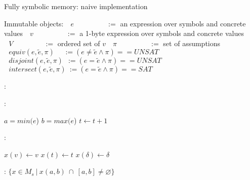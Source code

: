 \documentclass{article}
\let\emptyset\varnothing
\begin{document}
\begin{algorithm}
  \normalsize

  \caption{Fully symbolic memory: naive implementation}
  \begin{algorithmic}
  	\State Immutable objects:
  	\State $~~~e~~~~~~~~~~~~~~~~~~~\,~:=$ an expression over symbols and concrete values
  	\State $~~~v~~~~~~~~~~~~~~~~~~~~\,:=$ a 1-byte expression over symbols and concrete values
  	\State $~~~V~~~~~~~~~~~~~~~~~~~\,:=$ ordered set of $v$
  	\State $~~~\pi~~~~~~~~~~~~~~~~~~~~\,:=$ set of assumptions
  	\State $~~~equiv(e, \widetilde{e}, \pi)~~~~~\,:= (e \not = \widetilde{e} \wedge \pi) == UNSAT$ 
  	\State $~~~disjoint(e, \widetilde{e}, \pi)~~:=  (e = \widetilde{e} \wedge \pi) == UNSAT$ 
  	\State $~~~intersect(e, \widetilde{e}, \pi)~:=  (e = \widetilde{e} \wedge \pi) == SAT$ 

  \end{algorithmic}

  \bigskip
  
  \begin{algorithmic}[1]
	:
			\State {}
		\EndFor
	\EndFunction
  \end{algorithmic}

  \bigskip

  \begin{algorithmic}[1]
	:
		
		\State $a = min(e$)
		\State $b = max(e$)
		\State $t \leftarrow t + 1$
		\State {}

	\EndFunction
  \end{algorithmic}

  \bigskip

  \begin{algorithmic}[1]
	:
		
				\State $x(v) \leftarrow v$
				\State $x(t) \leftarrow t$
				\State $x(\delta) \leftarrow \delta$
				\State \Return
			\EndIf
		\EndFor
		\State {}
	\EndFunction
  \end{algorithmic}

  \bigskip

  \begin{algorithmic}[1]
	:
		\State \Return $\{x \in M_s~|~x(a,b)~\cap~[a, b] \neq \emptyset\}$
	\EndFunction
  \end{algorithmic}

\end{algorithm}
  
\end{document}

